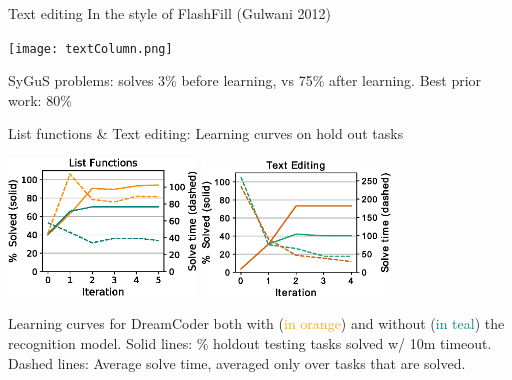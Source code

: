 \documentclass{beamer}
\newcommand{\orange}[1]{\textcolor{orange}{#1}}
\newcommand{\teal}[1]{\textcolor{teal}{#1}}
\begin{document}
\begin{frame}{Text editing}
  In the style of FlashFill (Gulwani 2012)

  \centering  \texttt{[image: textColumn.png]}

\vspace{-0.5cm}  SyGuS problems: solves 3\% before learning, vs 75\% after learning. Best prior work: 80\%

\end{frame}
\begin{frame}{List functions \& Text editing: Learning curves on hold out tasks}

  \begin{center}
    \includegraphics[width = 5cm]{figures/listLearningCurve.eps}
\hfill    \includegraphics[width = 5cm]{figures/textLearningCurve.eps} 
    \end{center}

Learning curves for DreamCoder both with (\orange{in orange}) and without
    (\teal{in teal}) the recognition model. Solid lines: \% holdout testing tasks solved w/ 10m timeout. Dashed lines: Average solve time, averaged only over tasks that are solved.


\end{frame}

\end{document}
